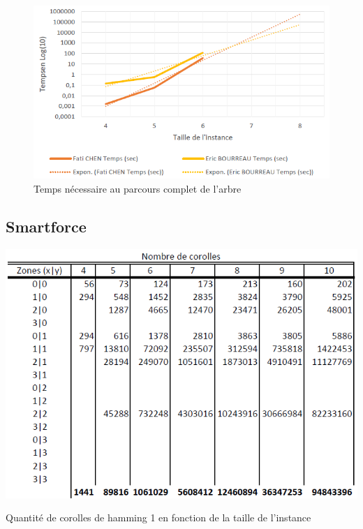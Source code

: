 \begin{appendices}
	\begin{figure}[H]
		\includegraphics[width=\linewidth]{images/resultat_bruteforce_rowscan}
		\caption{Temps nécessaire au parcours complet de l'arbre}
		\label{fig:results_bruteforce_graphique_compare}
	\end{figure}

	\subsection{Smartforce}\label{annexe:smartforce}
		\begin{table}[H]
			\centering
			\includegraphics[width=0.8\linewidth]{images/resultats_corolle_hamming_1}
			\caption{Quantité de corolles de hamming 1 en fonction de la taille de l'instance}
		\end{table}
		

\end{appendices}
